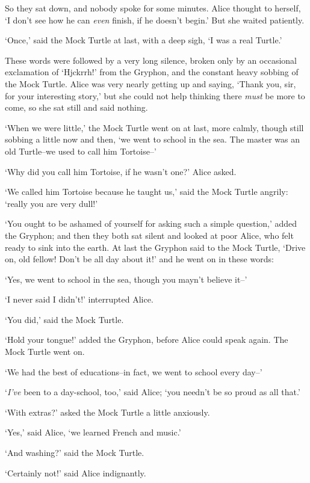   So they sat down, and nobody spoke for some minutes.  Alice
thought to herself, `I don't see how he can {\it even} finish, if he
doesn't begin.'  But she waited patiently.

  `Once,' said the Mock Turtle at last, with a deep sigh, `I was
a real Turtle.'

  These words were followed by a very long silence, broken only
by an occasional exclamation of `Hjckrrh!' from the Gryphon, and
the constant heavy sobbing of the Mock Turtle.  Alice was very
nearly getting up and saying, `Thank you, sir, for your
interesting story,' but she could not help thinking there {\it must} be
more to come, so she sat still and said nothing.

  `When we were little,' the Mock Turtle went on at last, more
calmly, though still sobbing a little now and then, `we went to
school in the sea.  The master was an old Turtle--we used to call
him Tortoise--'

  `Why did you call him Tortoise, if he wasn't one?' Alice asked.

  `We called him Tortoise because he taught us,' said the Mock
Turtle angrily:  `really you are very dull!'

  `You ought to be ashamed of yourself for asking such a simple
question,' added the Gryphon; and then they both sat silent and
looked at poor Alice, who felt ready to sink into the earth.  At
last the Gryphon said to the Mock Turtle, `Drive on, old fellow!
Don't be all day about it!' and he went on in these words:

  `Yes, we went to school in the sea, though you mayn't believe
it--'

  `I never said I didn't!' interrupted Alice.

  `You did,' said the Mock Turtle.

  `Hold your tongue!' added the Gryphon, before Alice could speak
again.  The Mock Turtle went on.

  `We had the best of educations--in fact, we went to school
every day--'

  `{\it I've} been to a day-school, too,' said Alice; `you needn't be
so proud as all that.'

  `With extras?' asked the Mock Turtle a little anxiously.

  `Yes,' said Alice, `we learned French and music.'

  `And washing?' said the Mock Turtle.

  `Certainly not!' said Alice indignantly.

